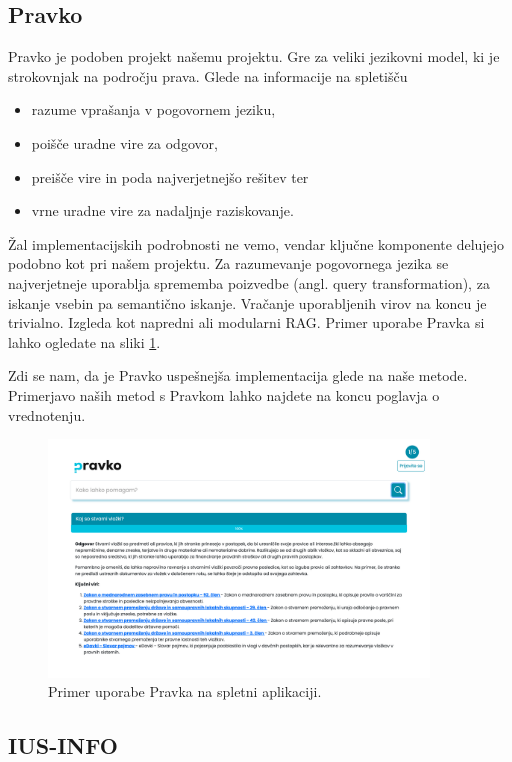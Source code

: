 \documentclass[a4paper,12pt,openright]{book}
\begin{document}
\subsection{Pravko}

Pravko \cite{pravko} je podoben projekt našemu projektu. Gre za veliki jezikovni model, ki je strokovnjak na področju prava. Glede na informacije na spletišču

\begin{itemize}
	\item razume vprašanja v pogovornem jeziku,
	\item poišče uradne vire za odgovor,
	\item preišče vire in poda najverjetnejšo rešitev ter
	\item vrne uradne vire za nadaljnje raziskovanje.
\end{itemize}

Žal implementacijskih podrobnosti ne vemo, vendar ključne komponente delujejo podobno kot pri našem projektu. Za razumevanje pogovornega jezika se najverjetneje uporablja sprememba poizvedbe (angl. query transformation), za iskanje vsebin pa semantično iskanje. Vračanje uporabljenih virov na koncu je trivialno. Izgleda kot napredni ali modularni RAG. Primer uporabe Pravka si lahko ogledate na sliki \ref{pravko}.

Zdi se nam, da je Pravko uspešnejša implementacija glede na naše metode. Primerjavo naših metod s Pravkom lahko najdete na koncu poglavja o vrednotenju.

\begin{figure}[htbp]
	\centering
	\includegraphics[width=0.9\textwidth]{pravko.png}
	\caption{Primer uporabe Pravka na spletni aplikaciji.}
	\label{pravko}
\end{figure}

\subsection{IUS-INFO}
\end{document}
